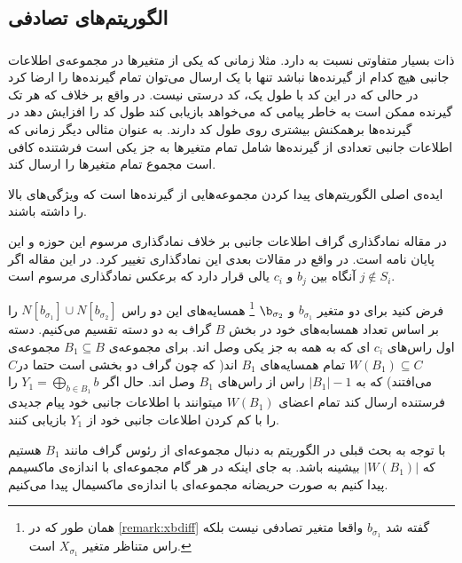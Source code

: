 \subsection{
الگوریتم‌های تصادفی
}
\subsubsection{
}
\picod
ذات بسیار متفاوتی نسبت به
\icod
دارد. مثلا زمانی که یکی از متغیرها در مجموعه‌ی اطلاعات جانبی هیچ کدام از گیرنده‌ها نباشد تنها با یک ارسال می‌توان تمام گیرنده‌ها را ارضا کرد در حالی که در
\icod
این کد با طول یک، کد درستی نیست. در واقع بر خلاف
\icod
که هر تک گیرنده ممکن است به خاطر پیامی که می‌خواهد بازیابی کند طول کد را افزایش دهد در
\picod
گیرنده‌ها برهمکنش بیشتری روی طول کد دارند. به عنوان مثالی دیگر زمانی که اطلاعات جانبی تعدادی از گیرنده‌ها شامل تمام متغیرها به جز یکی است فرشتنده کافی است مجموع تمام متغیرها را ارسال کند. 

ایده‌ی اصلی الگوریتم‌های
 پیدا کردن مجموعه‌هایی از گیرنده‌ها است که ویژگی‌های بالا را داشته باشند.
 
 \begin{remark}
 	در مقاله
 	\cite{pliablefirstpaper}
 	نمادگذاری گراف اطلاعات جانبی بر خلاف نمادگذاری مرسوم این حوزه و این پایان نامه است. در واقع در مقالات بعدی این نمادگذاری تغییر کرد. در این مقاله اگر
 	$j \notin S_i$
 	آنگاه بین
 	$b_j$
 	و
 	$c_i$
 	یالی قرار دارد که برعکس نمادگذاری مرسوم است.
 \end{remark}
 
 فرض کنید برای دو متغیر
 $b_{\sigma_1}$
 و
 $\b_{\sigma_2}$
 \footnote{
 همان طور که در
 \autoref{remark:xbdiff}
 گفته شد 
 $b_{\sigma_1}$
 واقعا متغیر تصادفی نیست بلکه راس متناظر متغیر
 $X_{\sigma_1}$
 است.
 }
 همسایه‌های این دو راس
 $N[b_{\sigma_1}] \cup N[b_{\sigma_2}]$
 را بر اساس تعداد همسابه‌های خود در بخش
 $B$
 گراف به دو دسته تقسیم می‌کنیم. دسته اول راس‌های
 $c_i$
 ای که به همه به جز یکی وصل اند. برای مجموعه‌ی
 $B_1 \subseteq B$
 مجموعه‌ی
 $W(B_1) \subseteq C$
 تمام همسایه‌های
 $B_1$
 اند( که چون گراف دو بخشی است حتما در$C$ می‌افتند) که به 
 $|B_1| - 1$
 راس از راس‌های
 $B_1$
  وصل اند. حال اگر
  $Y_1 = \bigoplus\limits_{b \in B_1} b$
  را فرستنده ارسال کند تمام اعضای
  $W(B_1)$
  میتوانند با اطلاعات جانبی خود پیام جدیدی را با کم کردن اطلاعات جانبی خود از
  $Y_1$
  بازیابی کنند.
  
 با توجه به بحث قبلی در الگوریتم
\GRCOVone
به دنبال مجموعه‌ای از رئوس گراف مانند
$B_1$
هستیم که 
$|W(B_1)|$
بیشینه باشد. به جای اینکه در هر گام مجموعه‌ای با اندازه‌ی ماکسیمم پیدا کنیم به صورت حریضانه مجموعه‌ای با اندازه‌ی ماکسیمال پیدا می‌کنیم.

